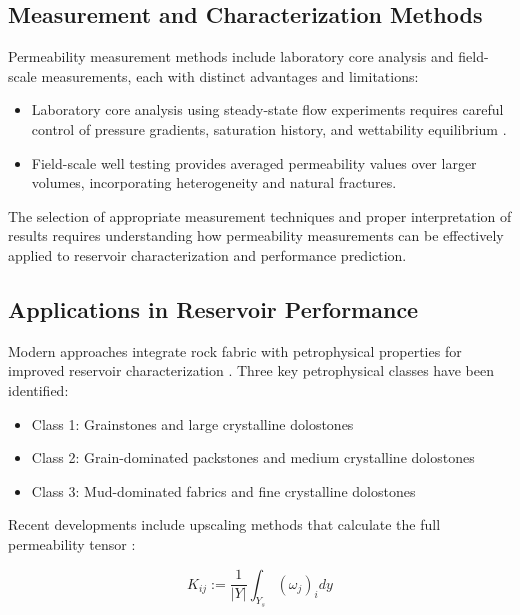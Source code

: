 \documentclass[journal]{IEEEtran}
\begin{document}
\subsection{Measurement and Characterization Methods}

Permeability measurement methods include laboratory core analysis and field-scale measurements, each with distinct advantages and limitations:

\begin{itemize}
    \item Laboratory core analysis using steady-state flow experiments requires careful control of pressure gradients, saturation history, and wettability equilibrium \parencite{chapuis_use_2003}.
    \item Field-scale well testing provides averaged permeability values over larger volumes, incorporating heterogeneity and natural fractures\parencite{honarpour_relative-permeability_1988}.
\end{itemize}

The selection of appropriate measurement techniques and proper interpretation of results requires understanding how permeability measurements can be effectively applied to reservoir characterization and performance prediction.

\subsection{Applications in Reservoir Performance}

Modern approaches integrate rock fabric with petrophysical properties for improved reservoir characterization \parencite{f_jerry_lucia_2_rock-fabricpetrophysical_1995}. Three key petrophysical classes have been identified:

\begin{itemize}
    \item Class 1: Grainstones and large crystalline dolostones
    \item Class 2: Grain-dominated packstones and medium crystalline dolostones
    \item Class 3: Mud-dominated fabrics and fine crystalline dolostones
\end{itemize}

Recent developments include upscaling methods that calculate the full permeability tensor \parencite{schulz_beyond_2019}:

\begin{equation}
K_{ij} := \frac{1}{|Y|}\int_{Y_s}(\omega_j)_i dy
\end{equation}
\end{document}
